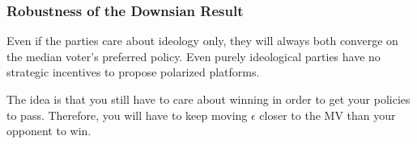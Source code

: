 \documentclass[letterpaper]{article}
\begin{document}
\subsubsection{Robustness of the Downsian Result}
Even if the parties care about ideology only, they will always both converge on the median voter's preferred policy. Even purely ideological parties have no strategic incentives to propose polarized platforms. 

\bigskip 

The idea is that you still have to care about winning in order to get your policies to pass. Therefore, you will have to keep moving $\epsilon$ closer to the MV than your opponent to win. 
\end{document}
